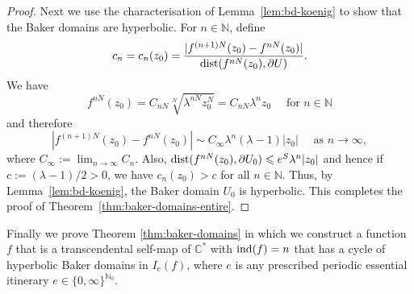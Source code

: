 \documentclass[a4paper, 12pt, reqno]{amsart}
\numberwithin{equation}{section}
\theoremstyle{plain}
\theoremstyle{definition}
\theoremstyle{remark}
\newcommand{\C}{{\mathbb{C}}}
\newcommand{\N}{{\mathbb{N}}}
\begin{document}
\begin{proof}
Next we use the characterisation of Lemma~\ref{lem:bd-koenig} to show that the Baker domains are hyperbolic. For $n\in\N$, define
$$
c_n=c_n(z_0)=\frac{|f^{(n+1)N}(z_0)-f^{nN}(z_0)|}{\textup{dist}(f^{nN}(z_0),\partial U)}.
$$
We have
$$
f^{nN}(z_0)=C_{nN}\sqrt[N]{\lambda^{nN}z_0^N}=C_{nN}\lambda^{n}z_0 \quad \mbox{ for } n\in\N
$$
and therefore
$$
|f^{(n+1)N}(z_0)-f^{nN}(z_0)|\sim C_\infty\lambda^n(\lambda-1)|z_0|\quad \mbox{ as } n\to\infty,
$$
where $C_\infty:=\lim_{n\to\infty} C_n$. Also, $\textup{dist}(f^{nN}(z_0),\partial U_0)\leqslant e^{S}\lambda^n|z_0|$ and hence if $c:=(\lambda-1)/2>0$, we have $c_n(z_0)>c$ for all $n\in\N$. Thus, by Lemma~\ref{lem:bd-koenig}, the Baker domain $U_0$ is hyperbolic. This completes the proof of Theorem~\ref{thm:baker-domains-entire}.
\end{proof}

Finally we prove Theorem \ref{thm:baker-domains} in which we construct a function~$f$ that is a transcendental self-map of $\C^*$ with $\textup{ind}(f)=n$ that has a cycle of hyperbolic Baker domains in $I_e(f)$, where $e$ is any prescribed periodic essential itinerary $e\in\{0,\infty\}^{\N_0}$.
\end{document}
